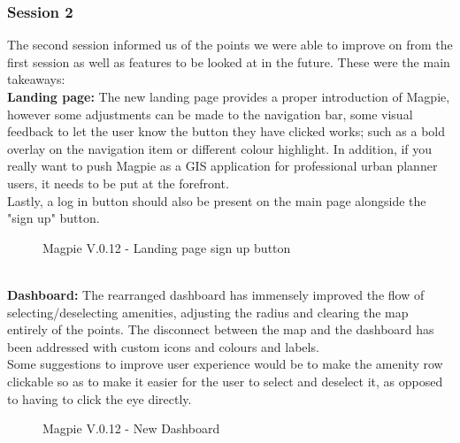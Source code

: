 \newpage
\subsubsection{Session 2}
The second session informed us of the points we were able to improve on from the first session as well as features to be looked at in the future. These were the main takeaways:\\

\noindent\textbf{Landing page: }
The new landing page provides a proper introduction of Magpie, however some adjustments can be made to the navigation bar, some visual feedback to let the user know the button they have clicked works; such as a bold overlay on the navigation item or different colour highlight. In addition, if you really want to push Magpie as a GIS application for professional urban planner users, it needs to be put at the forefront.\\
Lastly, a log in button should also be present on the main page alongside the "sign up" button.
\begin{figure}[h!]
    \centering
    \caption{Magpie V.0.12 - Landing page sign up button}
\end{figure}\\

\noindent \textbf{Dashboard: }
The rearranged dashboard has immensely improved the flow of selecting/deselecting amenities, adjusting the radius and clearing the map entirely of the points. The disconnect between the map and the dashboard has been addressed with custom icons and colours and labels.\\
Some suggestions to improve user experience would be to make the amenity row clickable so as to make it easier for the user to select and deselect it, as opposed to having to click the eye directly.
\begin{figure}[h!]
    \centering
    \caption{Magpie V.0.12 - New Dashboard}
\end{figure}

